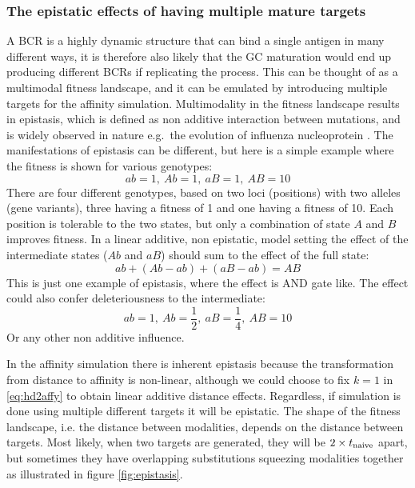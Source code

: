 \subsubsection{The epistatic effects of having multiple mature targets}
A BCR is a highly dynamic structure that can bind a single antigen in many different ways, it is therefore also likely that the GC maturation would end up producing different BCRs if replicating the process.
This can be thought of as a multimodal fitness landscape, and it can be emulated by introducing multiple targets for the affinity simulation.
Multimodality in the fitness landscape results in epistasis, which is defined as non additive interaction between mutations, and is widely observed in nature e.g.\ the evolution of influenza nucleoprotein \cite{gong2013stability}.
The manifestations of epistasis can be different, but here is a simple example where the fitness is shown for various genotypes:
$$
ab = 1,\ Ab = 1,\ aB = 1,\ AB = 10
$$
There are four different genotypes, based on two loci (positions) with two alleles (gene variants), three having a fitness of 1 and one having a fitness of 10.
Each position is tolerable to the two states, but only a combination of state $A$ and $B$ improves fitness.
In a linear additive, non epistatic, model setting the effect of the intermediate states ($Ab$ and $aB$) should sum to the effect of the full state:
$$
ab + (Ab - ab) + (aB -ab) = AB
$$
This is just one example of epistasis, where the effect is AND gate like.
The effect could also confer deleteriousness to the intermediate:
$$
ab = 1,\ Ab = \frac{1}{2},\ aB = \frac{1}{4},\ AB = 10
$$
Or any other non additive influence.

In the affinity simulation there is inherent epistasis because the transformation from distance to affinity is non-linear, although we could choose to fix $k=1$ in \eqref{eq:hd2affy} to obtain linear additive distance effects.
Regardless, if simulation is done using multiple different targets it will be epistatic.
The shape of the fitness landscape, i.e. the distance between modalities, depends on the distance between targets.
Most likely, when two targets are generated, they will be $2 \times t_{\text{naive}}$ apart, but sometimes they have overlapping substitutions squeezing modalities together as illustrated in figure \ref{fig:epistasis}.

